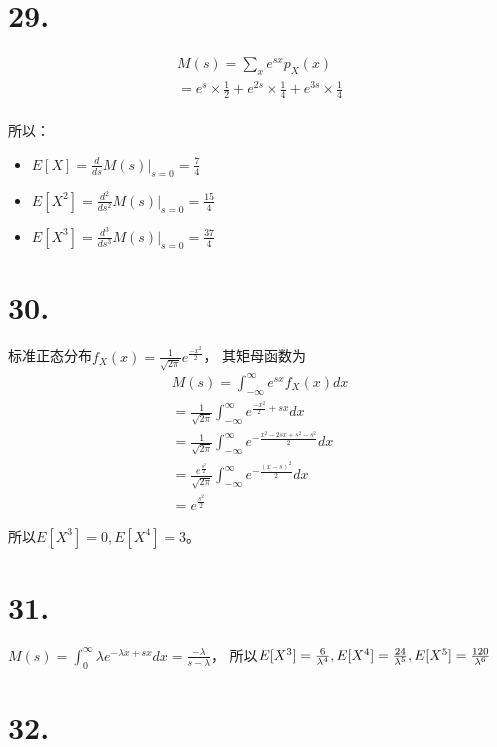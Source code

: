 \documentclass[UTF8]{report}
\begin{document}
    \section*{29.}
        $$\begin{array}{l}
            M(s) = \sum_{x}e^{sx}p_X(x)\\
            = e^s \times \frac{1}{2} + e^{2s} \times \frac{1}{4} + e^{3s} \times \frac{1}{4}\\
        \end{array}$$

        所以：
        \begin{itemize}
            \item $E[X] = \frac{d}{ds}M(s)|_{s = 0} = \frac{7}{4}$
            \item $E[X^2] = \frac{d^2}{ds^2}M(s)|_{s = 0} = \frac{15}{4}$
            \item $E[X^3] = \frac{d^3}{ds^3}M(s)|_{s = 0} = \frac{37}{4}$
        \end{itemize}
    \section*{30.}
        标准正态分布$f_X(x) = \frac{1}{\sqrt{2\pi}}e^{\frac{-x^2}{2}}$，
        其矩母函数为
        $$\begin{array}{l}
            M(s) = \int_{-\infty}^{\infty}e^{sx}f_X(x)dx\\
            = \frac{1}{\sqrt{2\pi}}\int_{-\infty}^{\infty}e^{\frac{-x^2}{2} + sx}dx\\
            = \frac{1}{\sqrt{2\pi}}\int_{-\infty}^{\infty}e^{-\frac{x^2 - 2sx + s^2 - s^2}{2}}dx\\
            = \frac{e^{\frac{s^2}{2}}}{\sqrt{2\pi}}\int_{-\infty}^{\infty}e^{-\frac{(x - s)^2}{2}}dx\\
            = e^{\frac{s^2}{2}}
        \end{array}$$

        所以$E[X^3] = 0, E[X^4] = 3$。
    \section*{31.}
        $M(s) = \int_{0}^{\infty}\lambda e^{-\lambda x + sx}dx = \frac{-\lambda}{s - \lambda}$，
        所以$E[X^3] = \frac{6}{\lambda^4}, E[X^4] = \frac{24}{\lambda^5},\\ E[X^5] = \frac{120}{\lambda^6}$
    \section*{32.}
\end{document}

